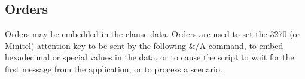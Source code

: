 \documentclass[letterpaper,10pt,english]{sphinxmanual}
\begin{document}
\ignorespaces 

\subsection{Orders}
\label{\detokenize{connectivity_guide:orders}}\label{\detokenize{connectivity_guide:index-120}}
\sphinxAtStartPar
Orders may be embedded in the clause data. Orders are used to set the 3270 (or Minitel) attention key to be sent by the following \&/A command, to embed hexadecimal or special values in the data, or to cause the script to wait for the first message from the application, or to process a scenario.
\end{document}
